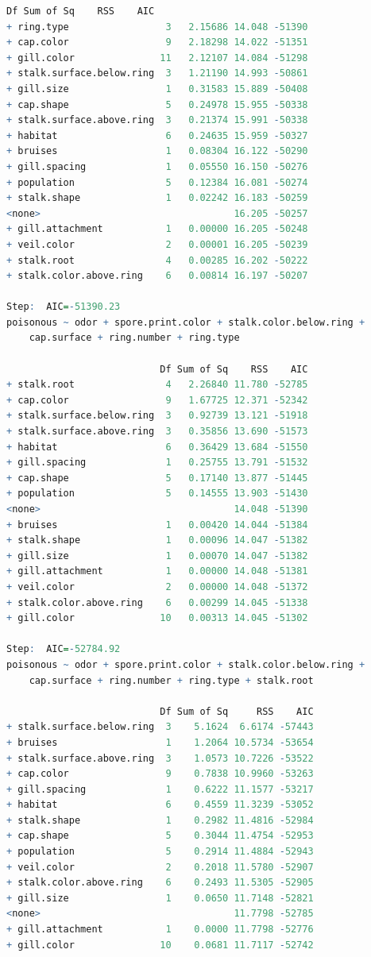 \documentclass[12pt]{article}
\begin{document}
\begin{lstlisting}[language = R]
                           Df Sum of Sq    RSS    AIC
+ ring.type                 3   2.15686 14.048 -51390
+ cap.color                 9   2.18298 14.022 -51351
+ gill.color               11   2.12107 14.084 -51298
+ stalk.surface.below.ring  3   1.21190 14.993 -50861
+ gill.size                 1   0.31583 15.889 -50408
+ cap.shape                 5   0.24978 15.955 -50338
+ stalk.surface.above.ring  3   0.21374 15.991 -50338
+ habitat                   6   0.24635 15.959 -50327
+ bruises                   1   0.08304 16.122 -50290
+ gill.spacing              1   0.05550 16.150 -50276
+ population                5   0.12384 16.081 -50274
+ stalk.shape               1   0.02242 16.183 -50259
<none>                                  16.205 -50257
+ gill.attachment           1   0.00000 16.205 -50248
+ veil.color                2   0.00001 16.205 -50239
+ stalk.root                4   0.00285 16.202 -50222
+ stalk.color.above.ring    6   0.00814 16.197 -50207

Step:  AIC=-51390.23
poisonous ~ odor + spore.print.color + stalk.color.below.ring + 
    cap.surface + ring.number + ring.type

                           Df Sum of Sq    RSS    AIC
+ stalk.root                4   2.26840 11.780 -52785
+ cap.color                 9   1.67725 12.371 -52342
+ stalk.surface.below.ring  3   0.92739 13.121 -51918
+ stalk.surface.above.ring  3   0.35856 13.690 -51573
+ habitat                   6   0.36429 13.684 -51550
+ gill.spacing              1   0.25755 13.791 -51532
+ cap.shape                 5   0.17140 13.877 -51445
+ population                5   0.14555 13.903 -51430
<none>                                  14.048 -51390
+ bruises                   1   0.00420 14.044 -51384
+ stalk.shape               1   0.00096 14.047 -51382
+ gill.size                 1   0.00070 14.047 -51382
+ gill.attachment           1   0.00000 14.048 -51381
+ veil.color                2   0.00000 14.048 -51372
+ stalk.color.above.ring    6   0.00299 14.045 -51338
+ gill.color               10   0.00313 14.045 -51302

Step:  AIC=-52784.92
poisonous ~ odor + spore.print.color + stalk.color.below.ring + 
    cap.surface + ring.number + ring.type + stalk.root

                           Df Sum of Sq     RSS    AIC
+ stalk.surface.below.ring  3    5.1624  6.6174 -57443
+ bruises                   1    1.2064 10.5734 -53654
+ stalk.surface.above.ring  3    1.0573 10.7226 -53522
+ cap.color                 9    0.7838 10.9960 -53263
+ gill.spacing              1    0.6222 11.1577 -53217
+ habitat                   6    0.4559 11.3239 -53052
+ stalk.shape               1    0.2982 11.4816 -52984
+ cap.shape                 5    0.3044 11.4754 -52953
+ population                5    0.2914 11.4884 -52943
+ veil.color                2    0.2018 11.5780 -52907
+ stalk.color.above.ring    6    0.2493 11.5305 -52905
+ gill.size                 1    0.0650 11.7148 -52821
<none>                                  11.7798 -52785
+ gill.attachment           1    0.0000 11.7798 -52776
+ gill.color               10    0.0681 11.7117 -52742


\end{lstlisting}
\end{document}
